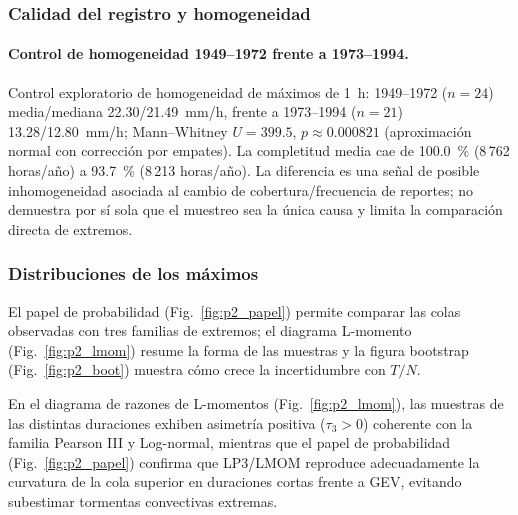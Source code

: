 
\subsubsection{Calidad del registro y homogeneidad}
\paragraph{Control de homogeneidad 1949--1972 frente a 1973--1994.} Control exploratorio de homogeneidad de máximos de
1~h: 1949--1972 ($n=24$) media/mediana 22.30/21.49~mm/h, frente a 1973--1994 ($n=21$) 13.28/12.80~mm/h;
Mann--Whitney $U=399.5$, $p\approx 0.000821$ (aproximación normal con corrección por empates). La completitud media
cae de 100.0~\% (8\,762 horas/año) a 93.7~\% (8\,213 horas/año). La diferencia es una señal de posible
inhomogeneidad asociada al cambio de cobertura/frecuencia de reportes; no demuestra por sí sola que el muestreo sea la
única causa y limita la comparación directa de extremos.

\subsubsection{Distribuciones de los máximos}
El papel de probabilidad (Fig.~\ref{fig:p2_papel}) permite comparar las colas observadas con tres familias de
extremos; el diagrama L-momento (Fig.~\ref{fig:p2_lmom}) resume la forma de las muestras y la figura bootstrap
(Fig.~\ref{fig:p2_boot}) muestra cómo crece la incertidumbre con $T/N$.

En el diagrama de razones de L-momentos (Fig.~\ref{fig:p2_lmom}), las muestras de las distintas duraciones exhiben
asimetría positiva ($\tau_3 > 0$) coherente con la familia Pearson III y Log-normal, mientras que el papel de
probabilidad (Fig.~\ref{fig:p2_papel}) confirma que LP3/LMOM reproduce adecuadamente la curvatura de la cola superior
en duraciones cortas frente a GEV, evitando subestimar tormentas convectivas extremas.

